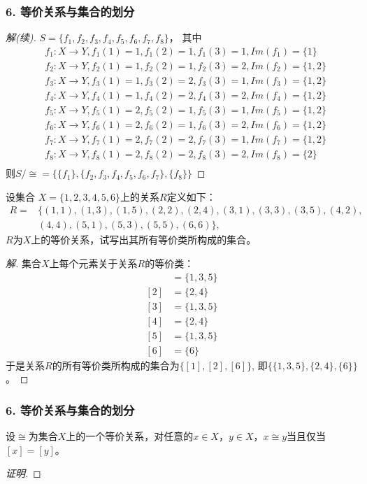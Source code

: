 \documentclass{beamer}
\begin{document}
\begin{CJK*}{UTF8}{gbsn}
\begin{frame}
\end{frame}
\begin{frame}
  \frametitle{6. 等价关系与集合的划分}
\begin{proof}[解(续)]
      $S=\{f_1,f_2,f_3,f_4,f_5,f_6,f_7,f_8\}$，
    其中
    \begin{align*}
      &f_1:X\to Y, f_1(1)=1,f_1(2)=1,f_1(3) = 1, Im(f_1)=\{1\}\\
      &f_2:X\to Y, f_2(1)=1,f_2(2)=1,f_2(3) = 2, Im(f_2)=\{1,2\}\\
      &f_3:X\to Y, f_3(1)=1,f_3(2)=2,f_3(3) = 1, Im(f_3)=\{1,2\}\\
      &f_4:X\to Y, f_4(1)=1,f_4(2)=2,f_4(3) = 2, Im(f_4)=\{1,2\}\\
      &f_5:X\to Y, f_5(1)=2,f_5(2)=1,f_5(3) = 1, Im(f_5)=\{1,2\}\\
      &f_6:X\to Y, f_6(1)=2,f_6(2)=1,f_6(3) = 2, Im(f_6)=\{1,2\}\\
      &f_7:X\to Y, f_7(1)=2,f_7(2)=2,f_7(3) = 1, Im(f_7)=\{1,2\}\\
      &f_8:X\to Y, f_8(1)=2,f_8(2)=2,f_8(3) = 2, Im(f_8)=\{2\}\\
    \end{align*}
    则$S/\cong=\{\{f_1\},\{f_2,f_3,f_4,f_5,f_6,f_7\},\{f_8\}\}$
  \end{proof}
  
\end{frame}

\begin{frame}
  \begin{Ex}
    设集合
    $X=\{1,2,3,4,5,6 \}$上的关系$R$定义如下：
    \begin{align*}
      R=&\{(1,1),(1,3),(1,5),(2,2),(2,4),(3,1),(3,3),(3,5),(4,2),\\
      &(4,4),(5,1),(5,3),(5,5),(6,6)\},
    \end{align*}
      $R$为$X$上的等价关系，试写出其所有等价类所构成的集合。
    \end{Ex}
    \pause
    {\small
    \begin{proof}[解]
      集合$X$上每个元素关于关系$R$的等价类：
      \begin{align*}
        [1]&=\{1,3,5\}\\
        [2]&=\{2,4\}\\
        [3]&=\{1,3,5\}\\
        [4]&=\{2,4\}\\
        [5]&=\{1,3,5\}\\
        [6]&=\{6\}
      \end{align*}
      于是关系$R$的所有等价类所构成的集合为$\{[1],[2],[6]\}$, 即$\{\{1,3,5\},\{2,4\},\{6\}\}$。
    \end{proof}
    }
\end{frame}
\begin{frame}
  \frametitle{6. 等价关系与集合的划分}
    \begin{Thm}
      设$\cong$为集合$X$上的一个等价关系，对任意的$x\in X$，$y\in X$，$x\cong y$当且仅当$[x]=[y]$。
    \end{Thm}  
    \pause
    \begin{proof}[证明]\justifying\let\raggedright\justifying


\end{proof}
\end{frame}
\end{CJK*}
\end{document}
